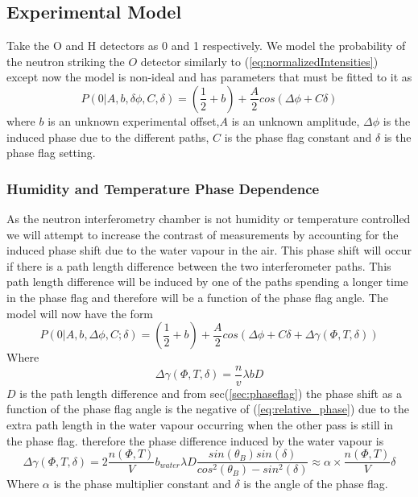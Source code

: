 \subsection{Experimental Model}
Take the O and H detectors as 0 and 1 respectively. We model the probability of the neutron striking the $O$ detector similarly to (\ref{eq:normalizedIntensities}) except now the model is non-ideal and has parameters that must be fitted to it as 
\begin{equation}
P(0|A,b,\delta\phi,C,\delta) = (\frac{1}{2}+b) + \frac{A}{2}cos(\Delta\phi+C\delta)
\label{eq:model1}
\end{equation}
where $b$ is an unknown experimental offset,$A$ is an unknown amplitude, $\Delta\phi$ is the induced phase due to the different paths, $C$ is the phase flag constant and $\delta$ is the phase flag setting. 
\subsubsection{Humidity and Temperature Phase Dependence}
As the neutron interferometry chamber is not humidity or temperature controlled we will attempt to increase the contrast of measurements by accounting for the induced phase shift due to the water vapour in the air. This phase shift will occur if there is a path length difference between the two interferometer paths. This path length difference will be induced by one of the paths spending a longer time in the phase flag and therefore will be a function of the phase flag angle. The model will now have the form 
\begin{equation}
P(0|A,b,\Delta\phi,C;\delta) = (\frac{1}{2}+b) + \frac{A}{2}cos(\Delta\phi+C\delta+\Delta\gamma(\Phi,T,\delta))
\end{equation}
Where 
\begin{equation*}
\Delta\gamma(\Phi,T,\delta) = \frac{n}{v}\lambda b D
\end{equation*}
$D$ is the path length difference and from sec(\ref{sec:phaseflag}) the phase shift as a function of the phase flag angle is the negative of (\ref{eq:relative_phase}) due to the extra path length in the water vapour occurring when the other pass is still in the phase flag. therefore the phase difference induced by the water vapour is 
\begin{equation}
\Delta\gamma(\Phi,T,\delta)= 2\frac{n(\Phi,T)}{V}b_{water}\lambda D\frac{sin(\theta_B)sin(\delta)}{cos^2(\theta_B)-sin^2(\delta)} \approx \alpha \times \frac{n(\Phi,T)}{V}\delta 
\label{eq:phasewater}
\end{equation}
Where $\alpha$ is the phase multiplier constant and $\delta$ is the angle of the phase flag.

